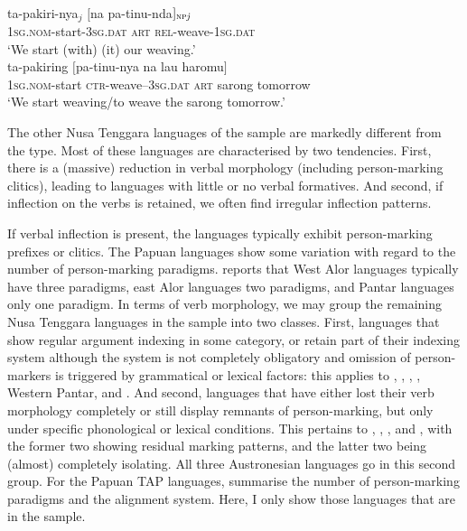 \ea 
{}\\
\ea \label{kamb2a}
\gll ta-pakiri-nya$_j$ $[$na pa-tinu-nda$]_{\textsc{np} \textit{j}}$ \\
\textsc{1}\textsc{sg}.\textsc{nom}-start-\textsc{3}\textsc{sg}.\textsc{dat} \textsc{art} \textsc{rel}-weave-\textsc{1}\textsc{sg}.\textsc{dat} \\
\glft `We start (with) (it) our weaving.' \\ 
\ex \label{kamb2b}
\gll ta-pakiring $[$pa-tinu-nya na lau haromu$]$ \\ 
\textsc{1}\textsc{sg}.\textsc{nom}-start \textsc{ctr}-weave--\textsc{3}\textsc{sg}.\textsc{dat} \textsc{art} sarong tomorrow \\
\glft `We start weaving/to weave the sarong tomorrow.'\\ 
\z
\z

The other Nusa Tenggara languages of the sample are markedly different from the  type. Most of these languages are characterised by two tendencies. First, there is a (massive) reduction in verbal morphology (including person-marking clitics), leading to languages with little or no verbal formatives. And second, if inflection on the verbs is retained, we often find irregular inflection patterns. 

\largerpage[-2]
If verbal inflection is present, the languages typically exhibit person-marking prefixes or clitics. The Papuan languages show some variation with regard to the number of person-marking paradigms. \citet{schapper2014intro} reports that West Alor languages typically have three paradigms, east Alor languages two paradigms, and Pantar languages only one paradigm. In terms of verb morphology, we may group the remaining Nusa Tenggara languages in the sample into two classes. First, languages that show regular argument indexing in some category, or retain part of their indexing system although the system is not completely obligatory and omission of person-markers is triggered by grammatical or lexical factors: this applies to , , , , Western Pantar, and . And second, languages that have either lost their verb morphology completely or still display remnants of person-marking, but only under specific phonological or lexical conditions. This pertains to , , , and , with the former two showing residual marking patterns, and the latter two being (almost) completely isolating. All three Austronesian languages go in this second group. For the Papuan TAP languages, \textcite{klamer2012development} summarise the number of person-marking paradigms and the alignment system. Here, I only show those languages that are in the sample.

